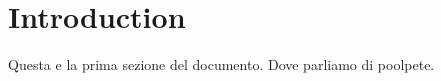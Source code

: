 
    \section{Introduction}
    Questa e la prima sezione del documento. Dove parliamo di poolpete.
